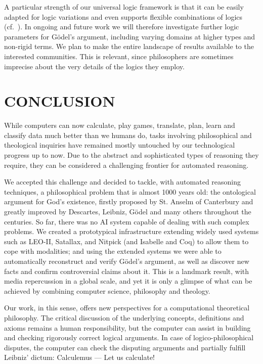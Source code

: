 \documentclass{ecai2014}
\begin{document}
{A particular strength of our universal logic framework is that it can
be easily adapted for logic variations and even supports flexible
combinations of logics (cf.~\cite{C36}). In ongoing and future work we
will therefore investigate further logic parameters for G{\"o}del's
argument, including varying domains at higher types and non-rigid
terms. We plan to make the entire landscape of results available to
the interested
communities. This is relevant, since philosophers are sometimes
imprecise about the very details of the logics they employ.



\section{CONCLUSION} \label{sec6} While computers can now calculate,
play games, translate, plan, learn and classify data much better than
we humans do, tasks involving philosophical and theological inquiries
have remained mostly untouched by our technological progress up to
now. Due to the abstract and sophisticated types of reasoning they
require, they can be considered a challenging frontier for automated
reasoning.  

We accepted this challenge and decided to tackle, with automated
reasoning techniques, a philosophical problem that is almost 1000
years old: the ontological argument for God's existence, firstly
proposed by St. Anselm of Canterbury and greatly improved by
Descartes, Leibniz, G{\"o}del and many others throughout the
centuries.  %
So far,
there was no AI system capable of dealing with
such complex problems. We created a prototypical infrastructure
extending widely used systems such as LEO-II, Satallax, and Nitpick
(and Isabelle and Coq) to allow them to cope with modalities; and
using the extended systems we were able to automatically reconstruct
and verify G{\"o}del's argument, as well as discover new facts and
confirm controversial claims about it.  This is a landmark result,
with media repercussion in a global scale, and yet it is only a
glimpse of what can be achieved by combining computer science,
philosophy and theology. 

Our work, in this sense, offers new perspectives for a
computational theoretical philosophy. The critical discussion of
the underlying concepts, definitions and axioms remains a human
responsibility, but the computer can assist in building and checking
rigorously correct logical arguments. In case of logico-philosophical
disputes, the computer can check the disputing arguments and partially
fulfill Leibniz' dictum: Calculemus --- Let us calculate!


}
\end{document}
